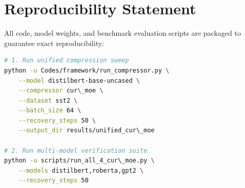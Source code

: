 \section{Reproducibility Statement}
All code, model weights, and benchmark evaluation scripts are packaged to guarantee exact reproducibility:
\begin{lstlisting}[language=bash]
# 1. Run unified compression sweep
python -u Codes/framework/run_compressor.py \
    --model distilbert-base-uncased \
    --compressor cur\_moe \
    --dataset sst2 \
    --batch_size 64 \
    --recovery_steps 50 \
    --output_dir results/unified_cur\_moe

# 2. Run multi-model verification suite
python -u scripts/run_all_4_cur\_moe.py \
    --models distilbert,roberta,gpt2 \
    --recovery_steps 50
\end{lstlisting}
